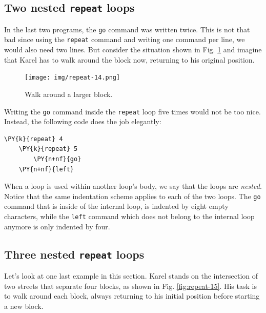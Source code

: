 \subsection{Two nested {\tt repeat} loops}

In the last two programs, the {\tt go} command was written twice. This is 
not that bad since using the {\tt repeat} command and writing one command 
per line, we would also need two lines. 
But consider the situation shown in Fig. \ref{fig:repeat-14} and imagine
that Karel has to walk around the block now, returning to his original 
position.
\newpage

\begin{figure}[!ht]
\begin{center}
\texttt{[image: img/repeat-14.png]}
\vspace{-0mm}
\caption{Walk around a larger block.}
\label{fig:repeat-14}
\end{center}
\end{figure}
\noindent
Writing the {\tt go} command inside the {\tt repeat} loop five times would not be too nice.
Instead, the following code does the job elegantly:\\

\begin{bbox}
\begin{Verbatim}[commandchars=\\\{\}]
\PY{k}{repeat} 4
    \PY{k}{repeat} 5
        \PY{n+nf}{go}
    \PY{n+nf}{left}
\end{Verbatim}
\end{bbox}
\vspace{6mm}

\noindent
When a loop is used within another loop's body, we say that the loops are {\em nested}.
Notice that the same indentation scheme applies to each of the two loops. The {\tt go}
command that is inside of the internal loop, is indented by eight empty characters, while 
the {\tt left} command which does not belong to the internal loop anymore is only indented 
by four.  

\subsection{Three nested {\tt repeat} loops} \label{subsec:3rep}

Let's look at one last example in this section. Karel stands on the intersection of 
two streets that separate four blocks, as shown in Fig. \ref{fig:repeat-15}. His 
task is to walk around each block, always returning to his initial position before 
starting a new block. 

